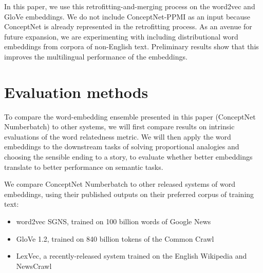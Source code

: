 \documentclass[letterpaper]{article}
\begin{document}


In this paper, we use this retrofitting-and-merging process on the
word2vec and GloVe embeddings. We do not include ConceptNet-PPMI as an input
because ConceptNet is already represented in the retrofitting process. As an
avenue for future expansion, we are experimenting with including distributional
word embeddings from corpora of non-English text. Preliminary results show that
this improves the multilingual performance of the embeddings.

\section{Evaluation methods}

To compare the word-embedding ensemble presented in this paper (ConceptNet
Numberbatch) to other systems, we will first compare results on intrinsic
evaluations of the word relatedness metric. We will then apply the word
embeddings to the downstream tasks of solving proportional analogies and
choosing the sensible ending to a story, to evaluate whether better embeddings
translate to better performance on semantic tasks.

We compare ConceptNet Numberbatch to other released systems of word embeddings,
using their published outputs on their preferred corpus of training text:

\begin{itemize}
    \item word2vec SGNS, trained on 100 billion words of Google News \cite{mikolov2013word2vec}
    \item GloVe 1.2, trained on 840 billion tokens of the Common Crawl \cite{pennington2014glove}
    \item LexVec, a recently-released system trained on the English Wikipedia and NewsCrawl \cite{salle2016lexvec}
\end{itemize}
\end{document}
